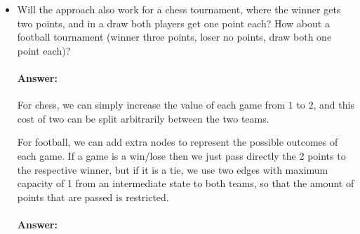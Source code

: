 \documentclass[a4paper]{article}
\begin{document}
\begin{itemize}
\item Will the approach also work for a chess tournament, where the winner gets two
points, and in a draw both players get one point each? How about a football tournament (winner three points, loser no points, draw both one point each)?

\paragraph{Answer:}

For chess, we can simply increase the value of each game from $1$ to $2$, and this cost of two can be split arbitrarily between the two teams.

For football, we can add extra nodes to represent the possible outcomes of each game. If a game is a win/lose then we just pass directly the 2 points to the respective winner, but if it is a tie, we use two edges with maximum capacity of 1 from an intermediate state to both teams, so that the amount of points that are passed is restricted.

\paragraph{Answer:}
\end{itemize}
\end{document}
